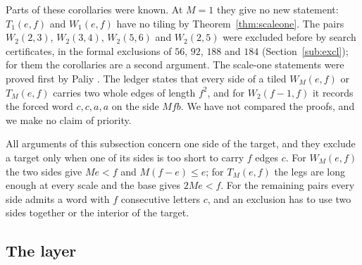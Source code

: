 \documentclass[11pt,reqno]{amsart}
\theoremstyle{plain}
\theoremstyle{definition}
\begin{document}
Parts of these corollaries were known. At $M=1$ they give no new statement: $T_1(e,f)$ and $W_1(e,f)$ have
no tiling by Theorem~\ref{thm:scaleone}. The pairs $W_2(2,3)$, $W_2(3,4)$, $W_2(5,6)$ and $W_2(2,5)$ were
excluded before by search certificates, in the formal exclusions of $56$, $92$, $188$ and $184$
(Section~\ref{sub:excl}); for them the corollaries are a second argument. The scale-one statements were
proved first by Paliy \cite{PaliyPrime}. The ledger \cite{PaliyLedger}
states that every side of a tiled $W_M(e,f)$ or $T_M(e,f)$ carries two whole edges of length $f^2$, and for
$W_2(f-1,f)$ it records the forced word $c,c,a,a$ on the side $Mfb$. We have not compared the proofs, and we
make no claim of priority.

All arguments of this subsection concern one side of the target, and they exclude a target only when one of
its sides is too short to carry $f$ edges $c$. For $W_M(e,f)$ the two sides give $Me<f$ and $M(f-e)\le e$;
for $T_M(e,f)$ the legs are long enough at every scale and the base gives $2Me<f$. For the remaining pairs
every side admits a word with $f$ consecutive letters $c$, and an exclusion has to use two sides together or
the interior of the target.

\subsection{The layer}
\end{document}
